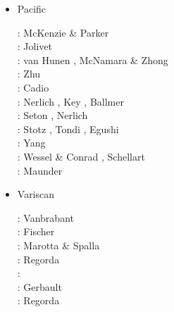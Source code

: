 \begin{itemize}
\item Pacific 

\begin{scriptsize}
\nineteensixtyseven: McKenzie \& Parker \cite{mcpa67}\\
\nineteenninety: Jolivet \etal \cite{jodc90}\\
\twothousandfive: van Hunen \etal \cite{vazs05}, McNamara \& Zhong \cite{mczh05a}\\
\twothousandten: Zhu \etal \cite{zhst10}\\
\twothousandeleven: Cadio \etal \cite{capd11}\\
\twothousandthirteen: Nerlich \etal \cite{necb13}, Key \etal \cite{kecl13}, Ballmer \etal \cite{bacs13}\\
\twothousandfifteen: Seton \etal \cite{sefw15}, Nerlich \etal \cite{necb15}\\
\twothousandseventeen: Stotz \etal \cite{stid17}, Tondi \etal \cite{togr17}, Egushi \cite{egim17}\\
\twothousandeighteen: Yang \etal \cite{yamz18}\\
\twothousandnineteen: Wessel \& Conrad \cite{weco19}, Schellart \etal \cite{sccs19}\\
\twothousandtwenty: Maunder \cite{mapg20}
\end{scriptsize}



\item Variscan 

\begin{scriptsize}
\nineteenninetynine: Vanbrabant \etal \cite{vajh99}\\
\twothousandfour: Fischer \etal \cite{fijj04} \\
\twothousandseven: Marotta \& Spalla \cite{masp07} \\
\twothousandthirteen: Regorda \etal \cite{rems13} \\
\twothousandseventeen: \cite{regorda} \\
\twothousandeighteen: Gerbault \etal \cite{gesr18} \\
\twothousandtwenty: Regorda \etal \cite{relr20}
\end{scriptsize}


\end{itemize}






